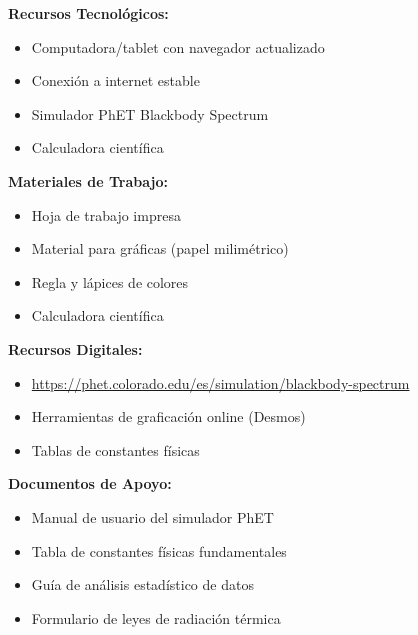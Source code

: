 \documentclass[12pt,a4paper]{article}
\begin{document}
	\begin{materialesbox}
		\begin{multicols}{2}
			\textbf{Recursos Tecnológicos:}
			\begin{itemize}[leftmargin=1cm]
				\item Computadora/tablet con navegador actualizado
				\item Conexión a internet estable
				\item Simulador PhET Blackbody Spectrum
				\item Calculadora científica
			\end{itemize}
			
			\textbf{Materiales de Trabajo:}
			\begin{itemize}[leftmargin=1cm]
				\item Hoja de trabajo impresa
				\item Material para gráficas (papel milimétrico)
				\item Regla y lápices de colores
				\item Calculadora científica
			\end{itemize}
			
			\columnbreak
			
			\textbf{Recursos Digitales:}
			\begin{itemize}[leftmargin=1cm]
				\item \url{https://phet.colorado.edu/es/simulation/blackbody-spectrum}
				\item Herramientas de graficación online (Desmos)
				\item Tablas de constantes físicas
			\end{itemize}
			
			\textbf{Documentos de Apoyo:}
			\begin{itemize}[leftmargin=1cm]
				\item Manual de usuario del simulador PhET
				\item Tabla de constantes físicas fundamentales
				\item Guía de análisis estadístico de datos
				\item Formulario de leyes de radiación térmica
			\end{itemize}
		\end{multicols}
	\end{materialesbox}
	
	
\end{document}
